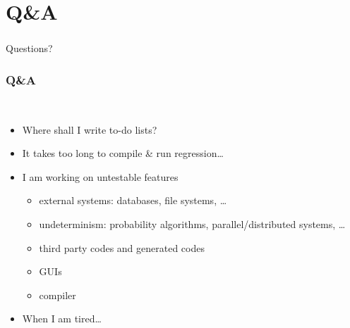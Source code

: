 \documentclass[lualatex]{beamer}
\begin{document}
\section{Q\&A}

\begin{frame}
  \frametitle{}
  \begin{center}
    \Huge
    Questions?
  \end{center}
\end{frame}

\begin{frame}
  \frametitle{Q\&A}

  \begin{block}{~}
    \begin{itemize}
    \item<1->
      Where shall I write to-do lists?
    \item<2->
      It takes too long to compile \& run regression\ldots
    \item<3->
      I am working on untestable features
      \begin{itemize}
      \item
        external systems: databases, file systems, \ldots
      \item
        undeterminism: probability algorithms, parallel/distributed systems, \ldots
      \item 
        third party codes and generated codes
      \item 
        GUIs
      \item 
        compiler
      \end{itemize}
    \item<4>
      When I am tired\ldots
    \end{itemize}
  \end{block}
\end{frame}
\end{document}
